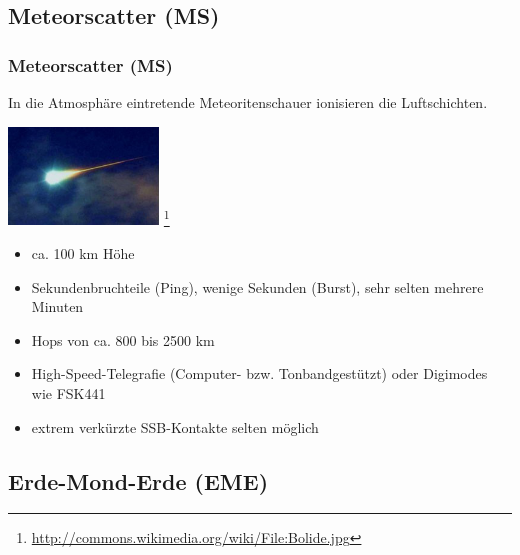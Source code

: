 \subsection{Meteorscatter (MS)}

\begin{frame}
    \frametitle{Meteorscatter (MS)}

    In die Atmosphäre eintretende Meteoritenschauer ionisieren die
    Luftschichten.

    \begin{center}
        \includegraphics[width=0.3\textwidth]{bv11/Bolide.jpg}
        \footnote{\tiny \url{http://commons.wikimedia.org/wiki/File:Bolide.jpg}}
    \end{center}

    \begin{itemize}
        \item ca. 100 km Höhe
        \item Sekundenbruchteile (Ping), wenige Sekunden (Burst), sehr selten
              mehrere Minuten
        \item Hops von ca. 800 bis 2500 km
        \item High-Speed-Telegrafie (Computer- bzw. Tonbandgestützt) oder Digimodes wie FSK441
        \item extrem verkürzte SSB-Kontakte selten möglich
    \end{itemize}


\end{frame}

\subsection[EME]{Erde-Mond-Erde (EME)}

